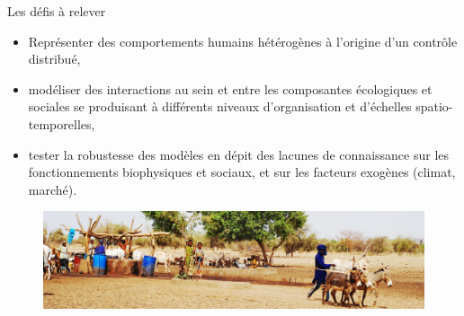 \documentclass[newPxFont]{beamer}
\begin{document}
\begin{frame}[c]{Les défis à relever}
\vspace{-2em}
	\begin{itemize}
		\item Représenter des \alert{\color{sthlmBlue}comportements humains hétérogènes} à l'origine d'un contrôle distribué,
		\item modéliser des \alert{interactions} au sein et entre les \alert{composantes écologiques et sociales} se produisant à différents niveaux d'organisation et d'\alert{échelles spatio-temporelles},
		\item tester la robustesse des modèles en dépit des \alert{\color{sthlmBlue}lacunes de connaissance} sur les fonctionnements biophysiques et sociaux, et sur les facteurs exogènes (climat, marché).
	\end{itemize}
  \begin{figure}
 			\centering
 				\includegraphics[width=\textwidth]{img/puis_ranerou.JPG}
	\end{figure}

\end{frame}

\end{document}
